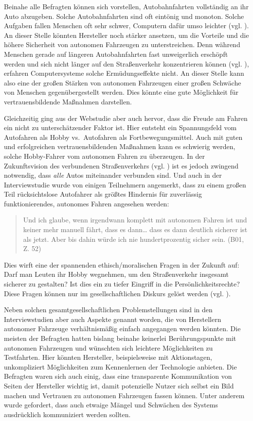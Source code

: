 Beinahe alle Befragten können sich vorstellen, Autobahnfahrten vollständig an ihr Auto abzugeben. Solche Autobahnfahrten sind oft eintönig und monoton. Solche Aufgaben fallen Menschen oft sehr schwer, Computern dafür umso leichter (vgl. \cite[15]{norman2013design}). An dieser Stelle könnten Hersteller noch stärker ansetzen, um die Vorteile und die höhere Sicherheit von autonomen Fahrzeugen zu unterstreichen. Denn während Menschen gerade auf längeren Autobahnfahrten fast unweigerlich erschöpft werden und sich nicht länger auf den Straßenverkehr konzentrieren können (vgl. \cite{ting2008driver}), erfahren Computersysteme solche Ermüdungseffekte nicht. An dieser Stelle kann also eine der großen Stärken von autonomen Fahrzeugen einer großen Schwäche von Menschen gegenübergestellt werden. Dies könnte eine gute Möglichkeit für vertrauensbildende Maßnahmen darstellen.

Gleichzeitig ging aus der Webstudie aber auch hervor, dass die Freude am Fahren ein nicht zu unterschätzender Faktor ist. Hier entsteht ein Spannungsfeld vom Autofahren als Hobby vs.\, Autofahren als Fortbewegungsmittel. Auch mit guten und erfolgreichen vertrauensbildenden Maßnahmen kann es schwierig werden, solche \glq Hobby-Fahrer\grq{} vom autonomen Fahren zu überzeugen. In der Zukunftsvision des verbundenen Straßenverkehrs (vgl. \cite{gerla2014internet}) ist es jedoch zwingend notwendig, dass \emph{alle} Autos miteinander verbunden sind. Und auch in der Interviewstudie wurde von einigen Teilnehmern angemerkt, dass zu einem großen Teil rücksichtslose Autofahrer als größtes Hindernis für zuverlässig funktionierendes, autonomes Fahren angesehen werden:

\begin{quote}
  Und ich glaube, wenn irgendwann komplett mit autonomen Fahren ist und keiner mehr manuell fährt, dass es dann… dass es dann deutlich sicherer ist als jetzt. Aber bis dahin würde ich nie hundertprozentig sicher sein. (B01, Z. 52)
\end{quote}

Dies wirft eine der spannenden ethisch/moralischen Fragen in der Zukunft auf: Darf man Leuten ihr Hobby wegnehmen, um den Straßenverkehr insgesamt sicherer zu gestalten? Ist dies ein zu tiefer Eingriff in die Persönlichkeitsrechte? Diese Fragen können nur im gesellschaftlichen Diskurs gelöst werden (vgl. \cite[12]{renn2010risk}).

Neben solchen gesamtgesellschaftlichen Problemstellungen sind in den Interviewstudien aber auch Aspekte genannt worden, die von Herstellern autonomer Fahrzeuge verhältnismäßig einfach angegangen werden könnten. Die meisten der Befragten hatten bislang beinahe keinerlei Berührungspunkte mit autonomen Fahrzeugen und wünschten sich leichtere Möglichkeiten zu Testfahrten. Hier könnten Hersteller, beispielsweise mit Aktionstagen, unkompliziert Möglichkeiten zum Kennenlernen der Technologie anbieten. Die Befragten waren sich auch einig, dass eine transparente Kommunikation von Seiten der Hersteller wichtig ist, damit potenzielle Nutzer sich selbst ein Bild machen und Vertrauen zu autonomen Fahrzeugen fassen können. Unter anderem wurde gefordert, dass auch etwaige Mängel und Schwächen des Systems ausdrücklich kommuniziert werden sollten.
